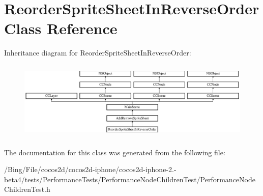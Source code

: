 \hypertarget{interface_reorder_sprite_sheet_in_reverse_order}{\section{Reorder\-Sprite\-Sheet\-In\-Reverse\-Order Class Reference}
\label{interface_reorder_sprite_sheet_in_reverse_order}
}
Inheritance diagram for Reorder\-Sprite\-Sheet\-In\-Reverse\-Order\-:\begin{figure}[H]
\begin{center}
\leavevmode
\includegraphics[height=3.783784cm]{interface_reorder_sprite_sheet_in_reverse_order}
\end{center}
\end{figure}


The documentation for this class was generated from the following file\-:\begin{DoxyCompactItemize}
\item 
/\-Bing/\-File/cocos2d/cocos2d-\/iphone/cocos2d-\/iphone-\/2.-\/beta4/tests/\-Performance\-Tests/\-Performance\-Node\-Children\-Test/Performance\-Node\-Children\-Test.\-h\end{DoxyCompactItemize}
